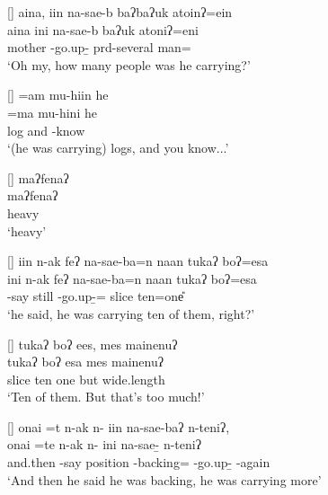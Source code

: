 \begin{exe}
{\begin{xlist}
	
\end{xlist}}

[]{\glll
	aina, iin na-sae-b baʔ{\tl}baʔuk atoinʔ=ein\\
	aina ini na-sae-b {\prd}baʔuk atoniʔ=eni \\
	mother {\iin} \na-go.up-{\b} prd-several man={\ein} \\
\glt `Oh my, how many people was he carrying?'}

[]{\glll
	 =am mu-hiin he \\
	 =ma mu-hini he \\
	log and \muu-know {\he} \\
\glt `(he was carrying) logs, and you know...'}

[]{\glll
	maʔfenaʔ \\
	maʔfenaʔ \\
	heavy \\
\glt `heavy'}

[]{\glll
	iin n-ak feʔ na-sae-ba=n naan tukaʔ boʔ=esa\\
	ini n-ak feʔ na-sae-ba=n naan tukaʔ boʔ=esa \\
	{\iin} \n-say still \nat-go.up-{\b}={\einV} {\naan} slice ten=one{\U} \\
\glt `he said, he was carrying ten of them, right?'}

[]{\glll
	tukaʔ boʔ ees, mes mainenuʔ\\
	tukaʔ boʔ esa mes mainenuʔ\\
	slice ten one but wide.length\\
\glt `Ten of them. But that's too much!'}

[]{\glll
	{onai =t} n-ak  n- iin na-sae-baʔ n-teniʔ, \\
	{onai =te} n-ak  n- ini na-sae-{\b} n-teniʔ \\
	and.then \n-say position \n-backing={\ii} {\iin} \nat-go.up-{\b} \n-again \\
\glt `And then he said he was backing, he was carrying more'}


\end{exe}
